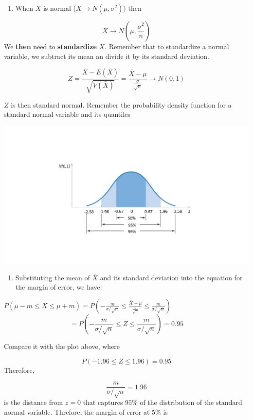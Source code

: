\documentclass[
]{book}
\providecommand{\tightlist}{%
  \setlength{\itemsep}{0pt}\setlength{\parskip}{0pt}}
\begin{document}
\begin{enumerate}
\def\labelenumi{\arabic{enumi}.}
\tightlist
\item
  When \(X\) is normal (\(X \rightarrow N(\mu, \sigma^2)\)) then
\end{enumerate}

\[\bar{X} \rightarrow N(\mu, \frac{\sigma^2}{n})\]
We \textbf{then} need to \textbf{standardize} \(\bar{X}\). Remember that to standardize a normal variable, we subtract its mean an divide it by its standard deviation.

\[Z=\frac{\bar{X}-E(\bar{X})}{\sqrt{V(\bar{X})}} =\frac{\bar{X}-\mu}{\frac{\sigma}{\sqrt{n}}}  \rightarrow N(0,1)\]

\(Z\) is then standard normal. Remember the probability density function for a standard normal variable and its quantiles

\includegraphics{./figures/phi.JPG}

\begin{enumerate}
\def\labelenumi{\arabic{enumi}.}
\setcounter{enumi}{1}
\tightlist
\item
  Substituting the mean of \(\bar{X}\) and its standard deviation into the equation for the margin of error, we have:
\end{enumerate}

\(P(\mu-m \leq \bar{X} \leq\mu + m)=P(-\frac{m}{\sigma/\sqrt{n}} \leq \frac{\bar{X}-\mu}{\frac{\sigma}{\sqrt{n}}}\leq\frac{m}{\sigma/\sqrt{n}})\)
\[=P(-\frac{m}{\sigma/\sqrt{n}} \leq Z \leq\frac{m}{\sigma/\sqrt{n}})=0.95\]

Compare it with the plot above, where

\[P(-1.96 \leq Z \leq 1.96)=0.95\]
Therefore,

\[\frac{m}{\sigma/\sqrt{n}}=1.96\]
is the distance from \(z=0\) that captures \(95\%\) of the distribution of the standard normal variable. Threfore, the margin of error at \(5\%\) is
\end{document}
